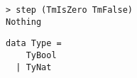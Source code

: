 
\begin{frame}[fragile]
\begin{verbatim}
> step (TmIsZero TmFalse)
Nothing
\end{verbatim}
\end{frame}

\begin{frame}[fragile]
  \begin{verbatim}
data Type =
    TyBool
  | TyNat
  \end{verbatim}
\end{frame}
